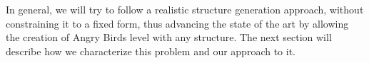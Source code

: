 \documentclass[sigconf]{acmart}
\begin{document}



In general, we will try to follow a realistic structure generation
approach, without constraining it to a fixed form, thus advancing the
state of the art by allowing the creation of Angry Birds level with
any structure. The next section will describe how we characterize this
problem and our approach to it.
\end{document}
